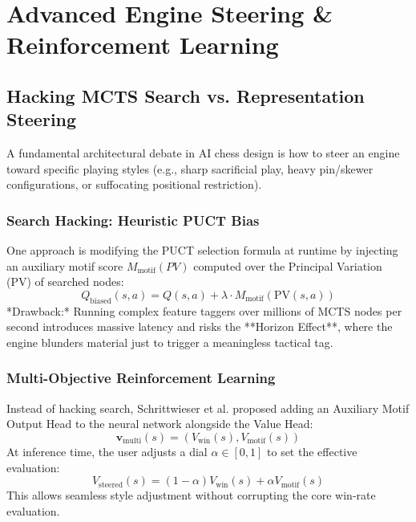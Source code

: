 \documentclass[11pt,a4paper]{report}
\begin{document}
\chapter{Advanced Engine Steering \& Reinforcement Learning}

\section{Hacking MCTS Search vs. Representation Steering}
A fundamental architectural debate in AI chess design is how to steer an engine toward specific playing styles (e.g., sharp sacrificial play, heavy pin/skewer configurations, or suffocating positional restriction).

\subsection{Search Hacking: Heuristic PUCT Bias}
One approach is modifying the PUCT selection formula at runtime by injecting an auxiliary motif score $M_{\text{motif}}(PV)$ computed over the Principal Variation (PV) of searched nodes:
\begin{equation}
Q_{\text{biased}}(s,a) = Q(s,a) + \lambda \cdot M_{\text{motif}}(\text{PV}(s,a))
\end{equation}
*Drawback:* Running complex feature taggers over millions of MCTS nodes per second introduces massive latency and risks the **Horizon Effect**, where the engine blunders material just to trigger a meaningless tactical tag.

\subsection{Multi-Objective Reinforcement Learning}
Instead of hacking search, Schrittwieser et al. proposed adding an Auxiliary Motif Output Head to the neural network alongside the Value Head:
\begin{equation}
\mathbf{v}_{\text{multi}}(s) = \left( V_{\text{win}}(s), V_{\text{motif}}(s) \right)
\end{equation}
At inference time, the user adjusts a dial $\alpha \in [0, 1]$ to set the effective evaluation:
\begin{equation}
V_{\text{steered}}(s) = (1 - \alpha) V_{\text{win}}(s) + \alpha V_{\text{motif}}(s)
\end{equation}
This allows seamless style adjustment without corrupting the core win-rate evaluation.
\end{document}
